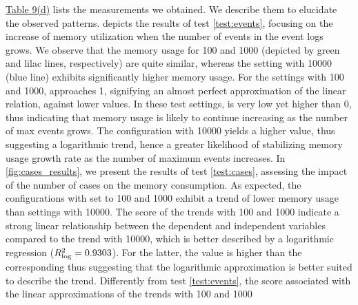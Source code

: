 \hyperref[table:TestCoefficentTable]{Table 9(d)} lists the measurements we obtained. We describe them to elucidate the observed patterns.  depicts the results of test \ref{test:events}, focusing on the increase of memory utilization when the number of events in the event logs grows. We observe that the memory usage for {\SegSize} \num{100} and \num{1000} (depicted by green and lilac lines, respectively) are quite similar, whereas the setting with {\SegSize} \num{10000} (blue line) exhibits significantly higher memory usage. For the settings with {\SegSize} \num{100} and \num{1000}, {\Rlin} approaches \num{1}, %
signifying an almost perfect approximation of the linear relation, against lower {\Rlog} values. %
In these test settings, {\Slope} is very low %
yet higher than \num{0}, thus indicating that memory usage is likely to continue increasing as the number of max events grows. The configuration with {\SegSize} \num{10000} yields a higher {\Rlog} value, %
thus suggesting a logarithmic trend, hence %
a greater likelihood of stabilizing memory usage growth rate as the number of maximum events increases. 
%
In  \cref{fig:cases_results}, we present the results of test \ref{test:cases}, assessing the impact of the number of cases on the memory consumption. As expected, the configurations with {\SegSize} set to \num{100} and \num{1000} exhibit a trend of lower memory usage than settings with {\SegSize} \num{10000}. The {\Rlin} score of the trends with {\SegSize} \num{100} and \num{1000} %
indicate a strong linear relationship between the dependent and independent variables compared to the trend with {\SegSize} \num{10000}, which is better described by a logarithmic regression (${R^2_\textrm{log}} = \num{0.9303}$). For the latter, the {\Rlog} value is higher than the corresponding {\Rlin} %
thus suggesting that the logarithmic approximation is better suited to describe the trend. %
Differently from test \ref{test:events}, the {\Slope} score associated with the linear approximations of the trends with {\SegSize} \num{100} and \num{1000} %
